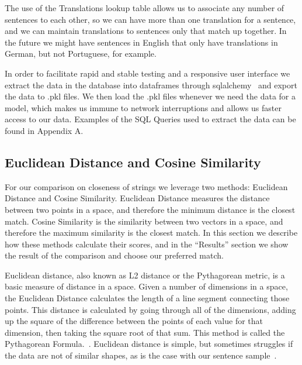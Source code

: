 \documentclass[runningheads]{llncs}
\begin{document}
	The use of the Translations lookup table allows us to associate any number of sentences to each other, so we can have more than one translation for a sentence, and we can maintain translations to sentences only that match up together. In the future we might have sentences in English that only have translations in German, but not Portuguese, for example. 	
\newline
	\begin{minipage}{\linewidth}
			\hspace*{-.25in}
  			 \noindent{}
			\label{fig:Database Diagrams}
			\vspace*{1cm}
	\end{minipage}
	\afterpage{\clearpage}

	In order to facilitate rapid and stable testing and a responsive user interface we extract the data in the database into dataframes through sqlalchemy~\cite{ref_url11} and export the data to .pkl files. We then load the .pkl files whenever we need the data for a model, which makes us immune to network interruptions and allows us faster access to our data. Examples of the SQL Queries used to extract the data can be found in Appendix A.
	

	\subsection{Euclidean Distance and Cosine Similarity}	
	For our comparison on closeness of strings we leverage two methods: Euclidean Distance and Cosine Similarity. Euclidean Distance measures the distance between two points in a space, and therefore the minimum distance is the closest match. Cosine Similarity is the similarity between two vectors in a space, and therefore the maximum similarity is the closest match. In this section we describe how these methods calculate their scores, and in the ``Results'' section we show the result of the comparison and choose our preferred match.
	
Euclidean distance, also known as L2 distance or the Pythagorean metric, is a basic measure of distance in a space. Given a number of dimensions in a space, the Euclidean Distance calculates the length of a line segment connecting those points. This distance is calculated by going through all of the dimensions, adding up the square of the difference between the points of each value for that dimension, then taking the square root of that sum. This method is called the Pythagorean Formula.~\cite{ref_url12}. Euclidean distance is simple, but sometimes struggles if the data are not of similar shapes, as is the case with our sentence sample~\cite{ref_url12}.
\end{document}
